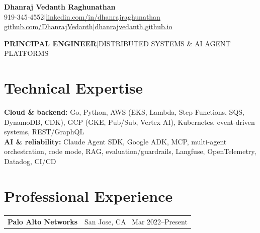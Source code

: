 \documentclass[11pt,letterpaper]{article}
\makeatletter
\newcommand{\job}[3]{\begin{tabularx}{\linewidth}{@{}Xr@{}}\textbf{#1}\enspace\textcolor{muted}{#2}&\textcolor{muted}{#3}\end{tabularx}}
\makeatother
\begin{document}
\begin{center}
{\fontsize{19.5}{22}\selectfont\bfseries Dhanraj Vedanth Raghunathan}\\[3pt]
919-345-4552\enspace$\vert$\enspace\href{https://linkedin.com/in/dhanrajraghunathan}{linkedin.com/in/dhanrajraghunathan}\\[2pt]
\href{https://github.com/DhanrajVedanth}{github.com/DhanrajVedanth}\enspace$\vert$\enspace\href{https://dhanrajvedanth.github.io/}{dhanrajvedanth.github.io}
\end{center}
\vspace{-5pt}
\begin{center}\textbf{PRINCIPAL ENGINEER}\enspace\textcolor{accent}{$\vert$}\enspace DISTRIBUTED SYSTEMS \& AI AGENT PLATFORMS\end{center}
\vspace{-7pt}

\section{Technical Expertise}
\textbf{Cloud \& backend:} Go, Python, AWS (EKS, Lambda, Step Functions, SQS, DynamoDB, CDK), GCP (GKE, Pub/Sub, Vertex AI), Kubernetes, event-driven systems, REST/GraphQL\\[2pt]
\textbf{AI \& reliability:} Claude Agent SDK, Google ADK, MCP, multi-agent orchestration, code mode, RAG, evaluation/guardrails, Langfuse, OpenTelemetry, Datadog, CI/CD

\section{Professional Experience}
\job{Palo Alto Networks}{}{San Jose, CA \textbar\ Mar 2022--Present}
\end{document}
